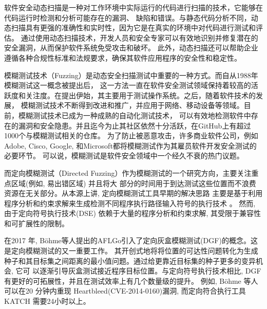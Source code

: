 \documentclass[bachelor]{njupthesis}
\begin{document}
软件安全动态扫描是一种对工作环境中实际运行的代码进行扫描的技术，它能够在代码运行时检测和分析可能存在的漏洞、
缺陷和错误。与静态代码分析不同，动态扫描具有更强的准确性和实时性，因为它是在真实的环境中对代码进行测试和评估。
通过使用动态扫描技术，开发人员和安全专家可以有效地识别并修复潜在的安全漏洞，从而保护软件系统免受攻击和破坏。
此外，动态扫描还可以帮助企业遵循各种合规性标准和法规要求，确保其软件应用程序的安全性和稳定性。

模糊测试技术（Fuzzing）是动态安全扫描测试中重要的一种方式。而自从1988年模糊测试这一概念被提出后，
这一方法一直在软件安全测试领域保持着较高的活跃度和关注度。在提出伊始，其主要用于测试操作系统。之后，随着软件技术的发展，
模糊测试技术不断得到改进和推广，并应用于网络、移动设备等领域。目前，模糊测试技术已成为一种成熟的自动化测试技术，
可以有效地检测软件中存在的漏洞和安全隐患。并且迄今为止其社区依然十分活跃，在GitHub上有超过1000个与模糊测试相关的仓库\cite{manes2019art}。
为了防止被恶意攻击，许多商业软件公司，例如Adobe, Cisco, Google, 和Microsoft都将模糊测试作为其雇员软件开发安全测试的必要环节。
可以说，模糊测试是软件安全领域中一个经久不衰的热门议题。

而定向模糊测试（Directed Fuzzing）作为模糊测试的一个研究方向，主要关注重点区域(例如, 易出错区域) 并且将大
部分的时间用于到达测试这些位置而不浪费资源在无关部分\cite{wang2022}。从本源上讲, 定向模糊测试工具早期的解决思路
主要是基于利用程序分析和约束求解来生成检测不同程序执行路径输入符号的执行技术
\cite{ganesh2009taint,ma2011directed,person2011directed,do2013dynamic,li2013software}。
然而, 由于定向符号执行技术(DSE) 依赖于大量的程序分析和约束求解, 其受限于兼容性和可扩展性的限制。

在2017 年, Böhme等人提出的AFLGo\cite{bohmeDGF2017}引入了定向灰盒模糊测试(DGF)的概念。这是定向模糊测试的又一重要工作。
其开创式地将将位置的可达性问题转化为生成种子和其目标集之间距离的最小值问题。通过给更靠近目标集的种子更多的变异机会, 它可
以逐渐引导灰盒测试接近程序目标位置。与定向符号执行技术相比, DGF有更好的可拓展性，并且在测试效率上有几个数量级的提升。
例如, Böhme 等人可以在20 分钟内重现 Heartbleed\cite{Heartbleed}(CVE-2014-0160)漏洞, 而定向符合执行工具
KATCH\cite{marinescu2013katch} 需要24小时以上\cite{bohmeDGF2017}。
\end{document}
